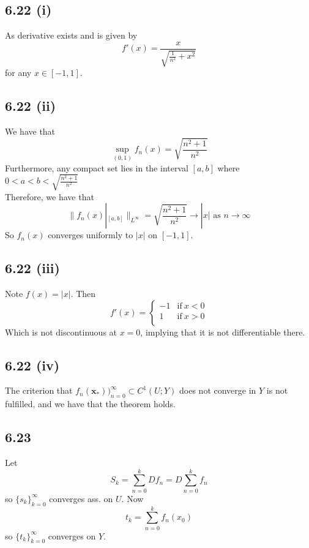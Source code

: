\documentclass[letterpaper,12pt]{article}
\theoremstyle{definition}
\begin{document}
\subsection*{6.22 (i)}
As derivative exists and is given by
        \[ f'(x) = \frac{x}{\sqrt{\frac{1}{n^2} + x^2} }\]
        for any $x \in [-1,1]$.

\subsection*{6.22 (ii)}
We have that \[\sup_{(0,1)} f_n(x) = \sqrt{\frac{n^2 + 1}{n^2}}\] Furthermore, any compact set lies in the interval 
        $[a,b]$ where $0<a<b<\sqrt{\frac{n^2+1}{n^2}}$\\
        Therefore, we have that \[\|f_n(x)|_{[a,b]}\|_{L^\infty} = \sqrt{\frac{n^2+1}{n^2}} \to |x| \text{ as }n \to \infty\]
        So $f_n(x)$ converges uniformly to $|x|$ on $[-1,1]$.

\subsection*{6.22 (iii)}
Note $f(x) = |x|$. Then 
        \[f'(x) = \begin{cases} -1 & \text{if}~x < 0 \\ 1 & \text{if}~x>0\\\end{cases}\]
        Which is not discontinuous at $x=0$, implying that it is not differentiable there.

\subsection*{6.22 (iv)}
The criterion that $f_n(\mathbf{x}_*))_{n=0}^\infty \subset C^1(U;Y)$ does not 
        converge in $Y$ is not fulfilled, and we have that the theorem holds.

\subsection*{6.23}
Let 
\[S_k = \sum^{k}_{n=0}  Df_n = D \sum^{k}_{n=0} f_n \]
so $\{s_k\}^\infty_{k=0}$ converges ass. on $U$. Now
\[t_k = \sum^{k}_{n=0} f_n(x_0)\]
so $\{t_k\}_{k=0}^\infty$ converges on $Y$.
\end{document}
